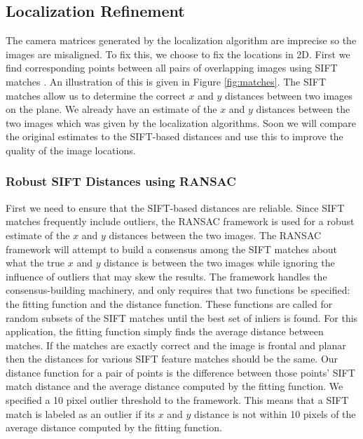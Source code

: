\documentclass[10pt,twocolumn,letterpaper]{article}
\begin{document}
\subsection{Localization Refinement}

The camera matrices generated by the localization algorithm are imprecise so the images are misaligned. To fix this, we choose to fix the locations in 2D. First we find corresponding points between all pairs of overlapping images using SIFT matches \cite{lowe1999object}. An illustration of this is given in Figure \ref{fig:matches}. The SIFT matches allow us to determine the correct $x$ and $y$ distances between two images on the plane. We already have an estimate of the $x$ and $y$ distances between the two images which was given by the localization algorithms. Soon we will compare the original estimates to the SIFT-based distances and use this to improve the quality of the image locations. 

\subsubsection{Robust SIFT Distances using RANSAC}

First we need to ensure that the SIFT-based distances are reliable. Since SIFT matches frequently include outliers, the RANSAC framework \cite{fischler1981random} is used for a robust estimate of the $x$ and $y$ distances between the two images. The RANSAC framework will attempt to build a consensus among the SIFT matches about what the true $x$ and $y$ distance is between the two images while ignoring the influence of outliers that may skew the results. The framework handles the consensus-building machinery, and only requires that two functions be specified: the fitting function and the distance function. These functions are called for random subsets of the SIFT matches until the best set of inliers is found. For this application, the fitting function simply finds the average distance between matches. If the matches are exactly correct and the image is frontal and planar then the distances for various SIFT feature matches should be the same. Our distance function for a pair of points is the difference between those points' SIFT match distance and the average distance computed by the fitting function. We specified a 10 pixel outlier threshold to the framework. This means that a SIFT match is labeled as an outlier if its $x$ and $y$ distance is not within 10 pixels of the average distance computed by the fitting function.
\end{document}
